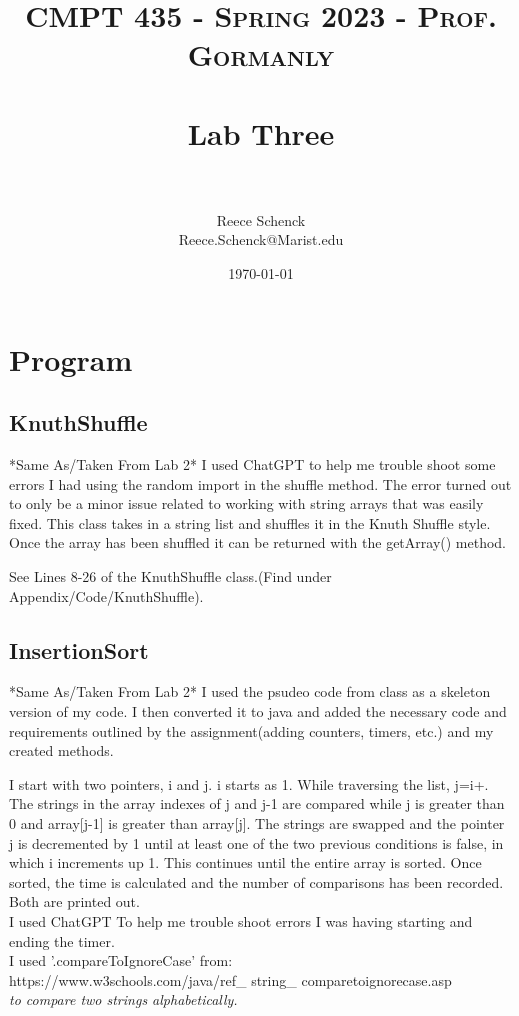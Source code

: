 \documentclass[10pt]{article}
\title{	
   \normalfont \normalsize 
   \textsc{CMPT 435 - Spring 2023 - Prof. Gormanly} \\[10pt] %
   \horrule{0.5pt} \\[0.25cm] 	%
   \huge Lab Three  \\     	    %
   \horrule{0.5pt} \\[0.25cm] 	%
}
\author{Reece Schenck \\ \normalsize Reece.Schenck@Marist.edu}
\date{\normalsize\today} 	%
\begin{document}
\maketitle %

\section{Program}

\subsection{KnuthShuffle}
*Same As/Taken From Lab 2*
\newline
I used ChatGPT to help me trouble shoot some errors I had using the random import in the shuffle method. 
The error turned out to only be a minor issue related to working with string arrays that was easily fixed.
This class takes in a string list and shuffles it in the Knuth Shuffle style.
Once the array has been shuffled it can be returned with the getArray() method.

See Lines 8-26 of the KnuthShuffle class.(Find under Appendix/Code/KnuthShuffle).

\subsection{InsertionSort}
*Same As/Taken From Lab 2*
\newline
I used the psudeo code from class as a skeleton version of my code. I then converted it to java and added the necessary code and requirements outlined by the assignment(adding counters, timers, etc.) and my created methods.

I start with two pointers, i and j. i starts as 1.
While traversing the list, j=i+. The strings in the array indexes of j and j-1 are compared while j is greater than 0 and array[j-1] is greater than array[j]. The strings are swapped and the pointer j is decremented by 1 until at least one of the two previous conditions is false, in which i increments up 1. This continues until the entire array is sorted. Once sorted, the time is calculated and the number of comparisons has been recorded. Both are printed out.
\\
\newline
I used ChatGPT To help me trouble shoot errors I was having starting and ending the timer.
\\
\newline
I used '.compareToIgnoreCase' from:
\\
https://www.w3schools.com/java/ref_ string_ comparetoignorecase.asp
\\
\emph{\normalfont to compare two strings alphabetically.}
\newline
\end{document}
